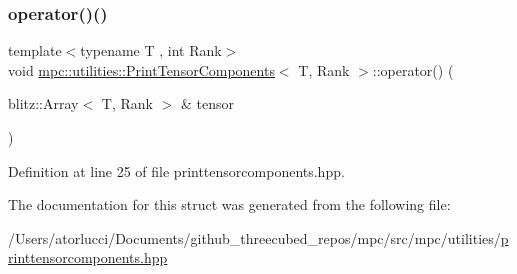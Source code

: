 \subsubsection{\texorpdfstring{operator()()}{operator()()}}
{\footnotesize\ttfamily template$<$typename T , int Rank$>$ \\
void \mbox{\hyperlink{structmpc_1_1utilities_1_1_print_tensor_components}{mpc\+::utilities\+::\+Print\+Tensor\+Components}}$<$ T, Rank $>$\+::operator() (\begin{DoxyParamCaption}\item[{blitz\+::\+Array$<$ T, Rank $>$ \&}]{tensor }\end{DoxyParamCaption})\hspace{0.3cm}{\ttfamily [inline]}}



Definition at line 25 of file printtensorcomponents.\+hpp.



The documentation for this struct was generated from the following file\+:\begin{DoxyCompactItemize}
\item 
/\+Users/atorlucci/\+Documents/github\+\_\+threecubed\+\_\+repos/mpc/src/mpc/utilities/\mbox{\hyperlink{printtensorcomponents_8hpp}{printtensorcomponents.\+hpp}}\end{DoxyCompactItemize}
